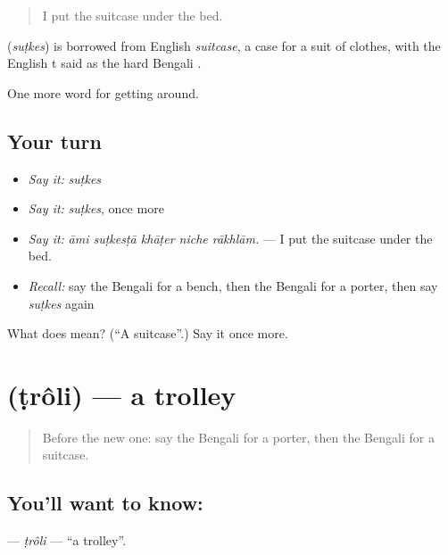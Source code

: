 \begin{quote}
I put the suitcase under the bed.
\end{quote}

\begin{cousinweb}
\textbf{} (\emph{suṭkes}) is borrowed from English \emph{suitcase}, a case for a suit of clothes, with the English t said as the hard Bengali .
\end{cousinweb}

\begin{grammarlens}[title={What you've built}]
One more word for getting around.
\end{grammarlens}

\subsection*{Your turn}
\begin{itemize}
\raggedright
  \item \emph{Say it:} \emph{suṭkes}
  \item \emph{Say it:} \emph{suṭkes}, once more
  \item \emph{Say it:} \emph{āmi suṭkesṭā khāṭer niche rākhlām.} — I put the suitcase under the bed.
  \item \emph{Recall:} say the Bengali for a bench, then the Bengali for a porter, then say \emph{suṭkes} again
\end{itemize}

\begin{tcolorbox}[breakable,colback=teal!4,colframe=teal!35!black,title={Before you move on}]
What does  mean? (\textquotedblleft{}A suitcase\textquotedblright{}.) Say it once more.
\end{tcolorbox}
\section[\texorpdfstring{\bn{ট্রলি} (ṭrôli)}{ট্রলি (ṭrôli)}]{ (ṭrôli) — a trolley}

\label{lesson:BN-C386-troli}



\begin{quote}
Before the new one: say the Bengali for a porter, then the Bengali for a suitcase.
\end{quote}

\subsection*{You'll want to know: }
\textbf{} — \emph{ṭrôli} — \textquotedblleft{}a trolley\textquotedblright{}.


